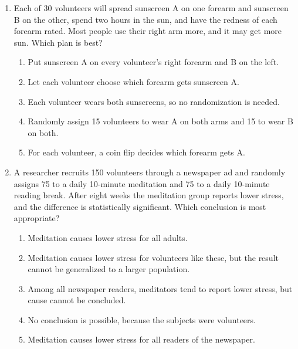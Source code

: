 \documentclass[12pt]{article}
\begin{document}
\begin{enumerate}[leftmargin=1.9em, itemsep=0.13in]
  \boxguard[15]
  \item Each of 30 volunteers will spread sunscreen A on one forearm and sunscreen B on the
        other, spend two hours in the sun, and have the redness of each forearm rated. Most
        people use their right arm more, and it may get more sun. Which plan is best?
        \begin{enumerate}[label=\textbf{(\Alph*)}, leftmargin=2.2em, itemsep=2pt]
          \item Put sunscreen A on every volunteer's right forearm and B on the left.
          \item Let each volunteer choose which forearm gets sunscreen A.
          \item Each volunteer wears both sunscreens, so no randomization is needed.
          \item Randomly assign 15 volunteers to wear A on both arms and 15 to wear B on both.
          \item For each volunteer, a coin flip decides which forearm gets A.\hfill{}\rule[-0.2in]{0pt}{0.48in}
        \end{enumerate}

  \boxguard[15]
  \item A researcher recruits 150 volunteers through a newspaper ad and randomly assigns 75 to a
        daily 10-minute meditation and 75 to a daily 10-minute reading break. After eight weeks
        the meditation group reports lower stress, and the difference is statistically
        significant. Which conclusion is most appropriate?
        \begin{enumerate}[label=\textbf{(\Alph*)}, leftmargin=2.2em, itemsep=2pt]
          \item Meditation causes lower stress for all adults.
          \item Meditation causes lower stress for volunteers like these, but the result cannot
                be generalized to a larger population.
          \item Among all newspaper readers, meditators tend to report lower stress, but cause
                cannot be concluded.
          \item No conclusion is possible, because the subjects were volunteers.
          \item Meditation causes lower stress for all readers of the newspaper.\hfill{}\rule[-0.2in]{0pt}{0.48in}
        \end{enumerate}

\end{enumerate}
\end{document}
